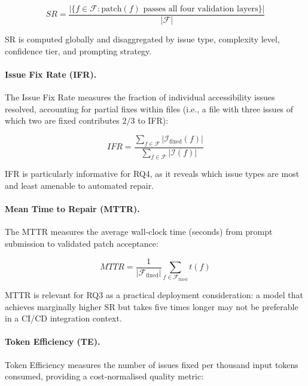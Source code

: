 \begin{equation}
  SR = \frac{|\{f \in \mathcal{F} : \text{patch}(f)\text{ passes all four validation layers}\}|}
            {|\mathcal{F}|}
  \label{eq:sr}
\end{equation}

\noindent
SR is computed globally and disaggregated by issue type, complexity level,
confidence tier, and prompting strategy.

\paragraph{Issue Fix Rate (IFR).}
The Issue Fix Rate measures the fraction of individual accessibility issues
resolved, accounting for partial fixes within files (i.e., a file with three
issues of which two are fixed contributes $2/3$ to IFR):

\begin{equation}
  IFR = \frac{\sum_{f \in \mathcal{F}} |\mathcal{I}_{\text{fixed}}(f)|}
             {\sum_{f \in \mathcal{F}} |\mathcal{I}(f)|}
  \label{eq:ifr}
\end{equation}

\noindent
IFR is particularly informative for RQ4, as it reveals which issue types
are most and least amenable to automated repair.

\paragraph{Mean Time to Repair (MTTR).}
The MTTR measures the average wall-clock time (seconds) from prompt
submission to validated patch acceptance:

\begin{equation}
  MTTR = \frac{1}{|\mathcal{F}_{\text{fixed}}|}
             \sum_{f \in \mathcal{F}_{\text{fixed}}} t(f)
  \label{eq:mttr}
\end{equation}

\noindent
MTTR is relevant for RQ3 as a practical deployment consideration: a model
that achieves marginally higher SR but takes five times longer may not be
preferable in a CI/CD integration context.

\paragraph{Token Efficiency (TE).}
Token Efficiency measures the number of issues fixed per thousand input tokens
consumed, providing a cost-normalised quality metric:

